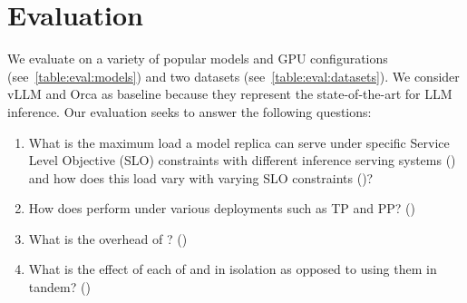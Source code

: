 \section{Evaluation}
\label{sec-eval}



















We evaluate \sysname on a variety of popular models and GPU configurations (see~\autoref{table:eval:models}) and two datasets (see~\autoref{table:eval:datasets}). We consider vLLM and Orca as baseline because they represent the state-of-the-art for LLM inference.  Our evaluation seeks to answer the following questions:
\begin{enumerate}[leftmargin=*] \itemsep0em 
    \item What is the maximum load a model replica can serve under specific Service Level Objective (SLO) constraints with different inference serving systems () and how does this load vary with varying SLO constraints ()? %
    \item How does \sysname perform under various deployments such as TP and PP? () %
    \item What is the overhead of \chunking? 
  ()
    \item What is the effect of each of \chunking and \hbatch in isolation as opposed to using them in tandem? ()
\end{enumerate}





\begin{table}[t!]
\caption{Datasets used for evaluation.}
\label{table:eval:datasets}
\end{table}

